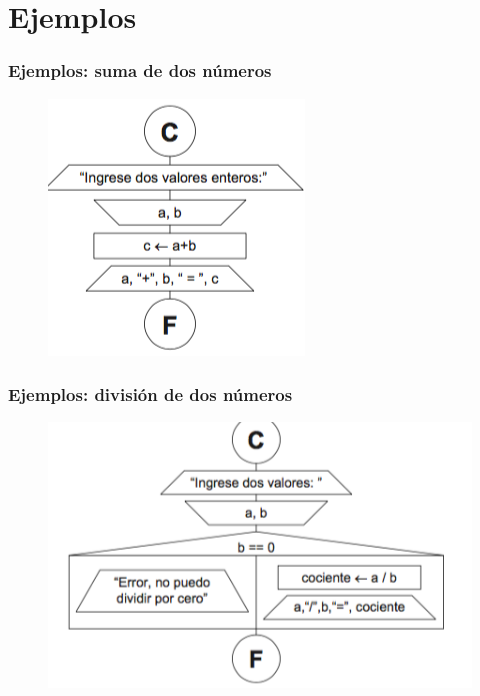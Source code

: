 \documentclass[handout]{beamer}
\begin{document}
\section{Ejemplos} %
\label{sec:ejemplos}
\begin{frame}[t]\frametitle{Ejemplos: suma de dos números}
    \begin{figure}[tb]
      \centering
      \includegraphics[scale=.7]{./img/suma2}
    \end{figure}
\end{frame}


\begin{frame}[t]\frametitle{Ejemplos: división de dos números}
    \begin{figure}[tb]
      \centering
      \includegraphics[scale=.7]{./img/div2}
    \end{figure}
\end{frame}

\end{document}
